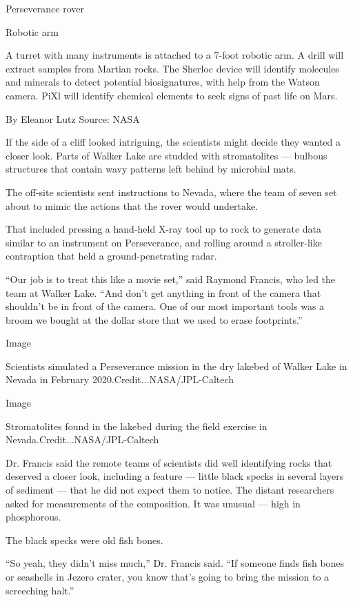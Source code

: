 Perseverance rover

Robotic arm

A turret with many instruments is attached to a 7-foot robotic arm. A
drill will extract samples from Martian rocks. The Sherloc device will
identify molecules and minerals to detect potential biosignatures, with
help from the Watson camera. PiXl will identify chemical elements to
seek signs of past life on Mars.

By Eleanor Lutz \textbar{} Source: NASA

If the side of a cliff looked intriguing, the scientists might decide
they wanted a closer look. Parts of Walker Lake are studded with
stromatolites --- bulbous structures that contain wavy patterns left
behind by microbial mats.

The off-site scientists sent instructions to Nevada, where the team of
seven set about to mimic the actions that the rover would undertake.

That included pressing a hand-held X-ray tool up to rock to generate
data similar to an instrument on Perseverance, and rolling around a
stroller-like contraption that held a ground-penetrating radar.

``Our job is to treat this like a movie set,'' said Raymond Francis, who
led the team at Walker Lake. ``And don't get anything in front of the
camera that shouldn't be in front of the camera. One of our most
important tools was a broom we bought at the dollar store that we used
to erase footprints.''

Image

Scientists simulated a Perseverance mission in the dry lakebed of Walker
Lake in Nevada in February 2020.Credit...NASA/JPL-Caltech

Image

Stromatolites found in the lakebed during the field exercise in
Nevada.Credit...NASA/JPL-Caltech

Dr. Francis said the remote teams of scientists did well identifying
rocks that deserved a closer look, including a feature --- little black
specks in several layers of sediment --- that he did not expect them to
notice. The distant researchers asked for measurements of the
composition. It was unusual --- high in phosphorous.

The black specks were old fish bones.

``So yeah, they didn't miss much,'' Dr. Francis said. ``If someone finds
fish bones or seashells in Jezero crater, you know that's going to bring
the mission to a screeching halt.''

